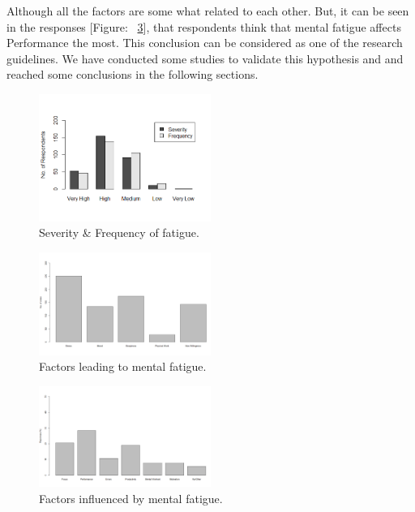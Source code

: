 \documentclass{acm_proc_article-sp}
\begin{document}
Although all the factors are some what related to each other. But, it can be
seen in the responses [Figure: ~\ref{fig:influence}], that respondents think
that mental fatigue affects Performance the most. This conclusion can be considered
as one of the research guidelines. We have conducted some studies to validate
this hypothesis and and reached some conclusions in the following sections.

   \begin{figure}
	\centering
	\includegraphics[width=0.5\textwidth,natwidth=517,natheight=382]{sevFreq.png}
	\caption{Severity \& Frequency of fatigue.}
	\label{fig:sevFreq}
   \end{figure}
   \begin{figure}
	\centering
	\includegraphics[width=0.5\textwidth,natwidth=1241,natheight=744]{factors.png}
	\caption{Factors leading to mental fatigue.}
	\label{fig:factors}
   \end{figure}
   \begin{figure}
	\centering
	\includegraphics[width=0.5\textwidth,natwidth=1242,natheight=749]{influenced.png}
	\caption{Factors influenced by mental fatigue.}
	\label{fig:influence}
   \end{figure}
   
\end{document}
